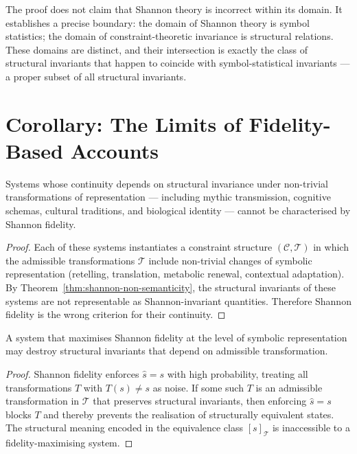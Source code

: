 \documentclass[11pt,openany]{book}
\begin{document}
\begin{remark}
The proof does not claim that Shannon theory is incorrect
within its domain.  It establishes a precise boundary: the
domain of Shannon theory is symbol statistics; the domain of
constraint-theoretic invariance is structural relations.
These domains are distinct, and their intersection is
exactly the class of structural invariants that happen to
coincide with symbol-statistical invariants — a proper
subset of all structural invariants.
\end{remark}

\section{Corollary: The Limits of Fidelity-Based Accounts}
\label{sec:corollary-fidelity}

\begin{corollary}
\label{cor:semantic-irreducibility}
Systems whose continuity depends on structural invariance
under non-trivial transformations of representation —
including mythic transmission, cognitive schemas, cultural
traditions, and biological identity — cannot be
characterised by Shannon fidelity.
\end{corollary}

\begin{proof}
Each of these systems instantiates a constraint structure
$(\mathcal{C}, \mathcal{T})$ in which the admissible
transformations $\mathcal{T}$ include non-trivial changes
of symbolic representation (retelling, translation,
metabolic renewal, contextual adaptation).  By
Theorem~\ref{thm:shannon-non-semanticity}, the structural
invariants of these systems are not representable as
Shannon-invariant quantities.  Therefore Shannon fidelity
is the wrong criterion for their continuity.
\end{proof}

\begin{corollary}
\label{cor:fidelity-destructive}
A system that maximises Shannon fidelity at the level of
symbolic representation may destroy structural invariants
that depend on admissible transformation.
\end{corollary}

\begin{proof}
Shannon fidelity enforces $\hat{s} = s$ with high
probability, treating all transformations $T$ with
$T(s) \neq s$ as noise.  If some such $T$ is an admissible
transformation in $\mathcal{T}$ that preserves structural
invariants, then enforcing $\hat{s} = s$ blocks $T$ and
thereby prevents the realisation of structurally equivalent
states.  The structural meaning encoded in the equivalence
class $[s]_{\mathcal{T}}$ is inaccessible to a
fidelity-maximising system.
\end{proof}
\end{document}
